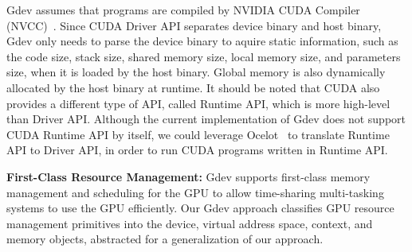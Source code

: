 Gdev assumes that programs are compiled by NVIDIA CUDA Compiler
(NVCC)~\cite{CUDA40}.
Since CUDA Driver API separates device binary and host binary, Gdev only
needs to parse the device binary to aquire static information, such
as the code size, stack size, shared memory size, local memory size, and
parameters size, when it is loaded by the host binary.
Global memory is also dynamically allocated by the host binary at
runtime.
It should be noted that CUDA also provides a different type of API,
called Runtime API, which is more high-level than Driver API.
Although the current implementation of Gdev does not support CUDA
Runtime API by itself, we could leverage Ocelot~\cite{Diamos_PACT10} to
translate Runtime API to Driver API, in order to run CUDA programs
written in Runtime API.

\textbf{First-Class Resource Management:}
Gdev supports first-class memory management and scheduling for the GPU
to allow time-sharing multi-tasking systems to use the GPU
efficiently.
Our Gdev approach classifies GPU resource management primitives into
the device, virtual address space, context, and memory objects,
abstracted for a generalization of our approach.
